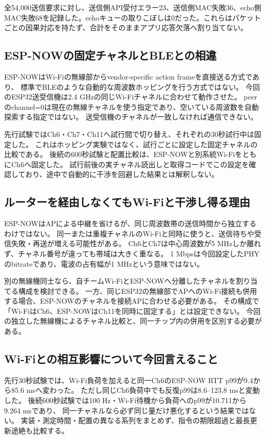 \documentclass[a4paper,10pt]{ltjsarticle}
\begin{document}
全54,000送信要求に対し、送信側API受付エラー23、送信側MAC失敗36、echo側MAC失敗68を記録した。echoキューの取りこぼしは0だった。これらはパケットごとの因果対応を持たず、合計をそのままアプリ応答欠落へ割り当てない。

\subsection{ESP-NOWの固定チャネルとBLEとの相違}
ESP-NOWはWi-Fiの無線部からvendor-specific action frameを直接送る方式であり、
標準でBLEのような自動的な周波数ホッピングを行う方式ではない\cite{espnowGuide}。
今回のESP32送受信機は2.4 GHzの同じWi-Fiチャネルに合わせて動作させた。
peerのchannel=0は現在の無線チャネルを使う指定であり、空いている周波数を自動探索する指定ではない。
送受信機のチャネルが一致しなければ通信できない。

先行試験ではCh6・Ch7・Ch11へ試行間で切り替え、それぞれの30秒試行中は固定した。
これはホッピング実験ではなく、試行ごとに設定した固定チャネルの比較である。
後続の600秒試験と配置比較は、ESP-NOWと別系統Wi-FiをともにCh6へ固定した。
試行前後の実チャネル読出しと取得コードでこの設定を確認しており、途中で自動的に干渉を回避した結果とは解釈しない。

\subsection{ルーターを経由しなくてもWi-Fiと干渉し得る理由}
ESP-NOWはAPによる中継を省けるが、同じ周波数帯の送信時間から独立するわけではない。
同一または重複チャネルのWi-Fiと同時に使うと、送信待ちや受信失敗・再送が増える可能性がある。
Ch6とCh7は中心周波数が5 MHzしか離れず、チャネル番号が違っても帯域は大きく重なる。
1 Mbpsは今回設定したPHYのbitrateであり、電波の占有幅が1 MHzという意味ではない。

別の無線機同士なら、自チームWi-FiとESP-NOWへ分離したチャネルを割り当てる構成を検討できる。
一方、同じESP32の無線部でAPへのWi-Fi接続も併用する場合、ESP-NOWのチャネルを接続APに合わせる必要がある\cite{espnowFAQ}。
その構成で「Wi-FiはCh6、ESP-NOWはCh11を同時に固定する」とは設定できない。
今回の独立した無線機によるチャネル比較と、同一チップ内の併用を区別する必要がある。

\subsection{Wi-Fiとの相互影響について今回言えること}
先行30秒試験では、Wi-Fi負荷を加えると同一Ch6のESP-NOW RTT p99が9.4から85.6 msへ変わった。
ただし同じCh6負荷中でも反復p99は8.6--123.8 msと変動した。
後続600秒試験では100 Hz・Wi-Fi待機から負荷へのp99が10.711から9.264 msであり、
同一チャネルなら必ず同じ量だけ悪化するという結果ではない。
実装・測定時間・配置の異なる系列をまとめず、指令の期限超過と最長更新途絶も比較する。
\end{document}
